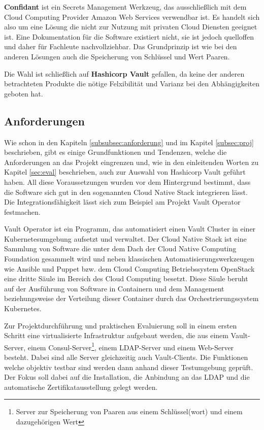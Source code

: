 \documentclass[
book,
a4paper,   
titlepage,  
halfparskip,
12pt        
]{scrartcl}
\begin{document}
\begin{onehalfspacing}
\textbf{Confidant} ist ein Secrets Management Werkzeug, das ausschließlich mit dem Cloud Computing Provider Amazon Web Services verwendbar ist. Es handelt sich also um eine Lösung die nicht zur Nutzung mit privaten Cloud Diensten geeignet ist. Eine Dokumentation für die Software existiert nicht, sie ist jedoch quelloffen und daher für Fachleute nachvollziehbar. Das Grundprinzip ist wie bei den anderen Lösungen auch die Speicherung von Schlüssel und Wert Paaren.\cite{lyft}

Die Wahl ist schließlich auf \textbf{Hashicorp Vault} gefallen, da keine der anderen betrachteten Produkte die nötige Felxibilität und Varianz bei den Abhängigkeiten geboten hat. 

\subsection{Anforderungen}
\label{subsec:anf}
Wie schon in den Kapiteln \vref{subsubsec:anforderung} und im Kapitel \vref{subsec:proj} beschrieben, gibt es einige Grundfunktionen und Tendenzen, welche die Anforderungen an das Projekt eingrenzen und, wie in den einleitenden Worten zu Kapitel \vref{sec:eval} beschrieben, auch zur Auswahl von Hashicorp Vault geführt haben. All diese Voraussetzungen wurden vor dem Hintergrund bestimmt, dass die Software sich gut in den sogenannten Cloud Native Stack integrieren lässt. Die Integrationsfähigkeit lässt sich zum Beispiel am Projekt Vault Operator \cite{operator} festmachen.

Vault Operator ist ein Programm, das automatisiert einen Vault Cluster in einer Kubernetesumgebung aufsetzt und verwaltet. Der Cloud Native Stack ist eine Sammlung von Software die unter dem Dach der Cloud Native Computing Foundation gesammelt wird und neben klassischen Automatisierungswerkzeugen wie Ansible und Puppet bzw. dem Cloud Computing Betriebssystem OpenStack eine dritte Säule im Bereich des Cloud Computing besetzt. Diese Säule beruht auf der Ausführung von Software in Containern und dem Management beziehungsweise der Verteilung dieser Container durch das Orchestrierungssystem Kubernetes.

Zur Projektdurchführung und praktischen Evaluierung soll in einem ersten Schritt eine virtualisierte Infrastruktur aufgebaut werden, die aus einem Vault-Server, einem Consul-Server\footnote{Server zur Speicherung von Paaren aus einem Schlüssel(wort) und einem dazugehörigen Wert}, einem \acs{LDAP}-Server und einem Web-Server besteht. Dabei sind alle Server gleichzeitig auch Vault-Clients. Die Funktionen welche objektiv testbar sind werden dann anhand dieser Testumgebung geprüft. Der Fokus soll dabei auf die Installation,  die Anbindung an das \ac{LDAP} und die automatische Zertifikatausstellung gelegt werden.


\end{onehalfspacing}
\end{document}
